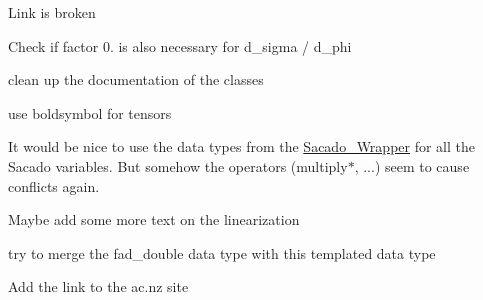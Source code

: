 
\begin{DoxyRefList}
\item[\label{todo__todo000001}%
\hypertarget{todo__todo000001}{}%
page \hyperlink{index}{Trilinos\+:\+:Sacado example documentation} ]Link is broken

Check if factor 0. is also necessary for d\+\_\+sigma / d\+\_\+phi

clean up the documentation of the classes

use boldsymbol for tensors

It would be nice to use the data types from the \hyperlink{namespaceSacado__Wrapper}{Sacado\+\_\+\+Wrapper} for all the Sacado variables. But somehow the operators (multiply$\ast$, ...) seem to cause conflicts again.

Maybe add some more text on the linearization 

try to merge the fad\+\_\+double data type with this templated data type 

Add the link to the ac.\+nz site
\end{DoxyRefList}